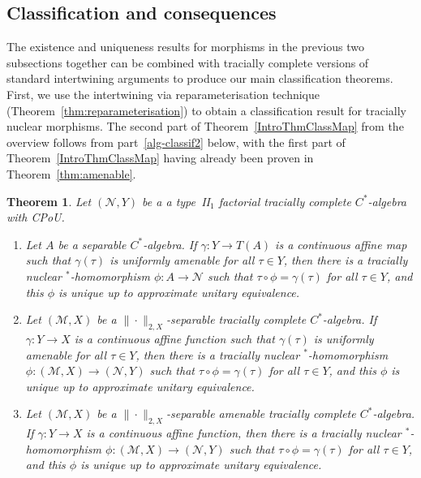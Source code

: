 \documentclass[a4paper,11pt]{amsart}
\newtheorem{theorem}{Theorem}
\theoremstyle{definition}
\numberwithin{equation}{section}
\numberwithin{theorem}{section}
\newcommand{\M}{\mathcal{M}}
\begin{document}
\subsection{Classification and consequences}\label{sec:classification-theorems}

The existence and uniqueness results for morphisms in the previous two subsections together can be combined with tracially complete versions of standard intertwining arguments to produce our main classification theorems.  First, we use the intertwining via reparameterisation technique (Theorem~\ref{thm:reparameterisation}) to obtain a classification result for tracially nuclear morphisms.  The second part of Theorem~\ref{IntroThmClassMap} from the overview follows from part~\ref{alg-classif2} below, with the first part of Theorem~\ref{IntroThmClassMap} having already been proven in Theorem~\ref{thm:amenable}.

\begin{theorem}
	\label{thm:classification-morphism}
Let $(\mathcal N,Y)$ be a  a type~{\rm II}$_1$ factorial tracially complete $C^*$-algebra with CPoU.
	\begin{enumerate}
		\item\label{classif1} Let $A$ be a separable $C^*$-algebra. If $\gamma \colon Y \rightarrow T(A)$ is a continuous affine map such that $\gamma(\tau)$ is uniformly amenable for all $\tau \in Y$, then there is a tracially nuclear $^*$-homomorphism $\phi \colon A \rightarrow \mathcal N$ such that \mbox{$\tau \circ \phi = \gamma(\tau)$} for all $\tau \in Y$, and this $\phi$ is unique up to approximate unitary equivalence.
		\item \label{classif2} Let $(\M,X)$ be a $\|\cdot\|_{2,X}$-separable tracially complete $C^*$-algebra. If $\gamma \colon Y \rightarrow X$ is a continuous affine function such that $\gamma(\tau)$ is uniformly amenable for all $\tau \in Y$, then there is a tracially nuclear $^*$-homomorphism $\phi \colon (\mathcal M, X) \rightarrow (\mathcal N, Y)$ such that $\tau \circ \phi = \gamma(\tau)$ for all $\tau \in Y$, and this $\phi$ is unique up to approximate unitary equivalence.
  \item\label{classif3} Let $(\M,X)$ be a $\|\cdot\|_{2,X}$-separable {}amenable tracially complete $C^*$-algebra. If $\gamma \colon Y \rightarrow X$ is a continuous affine function, then there is a tracially nuclear $^*$-homomorphism $\phi \colon (\mathcal M, X) \rightarrow (\mathcal N, Y)$ such that $\tau \circ \phi = \gamma(\tau)$ for all $\tau \in Y$, and this $\phi$ is unique up to approximate unitary equivalence.
	\end{enumerate}
\end{theorem}
\end{document}
